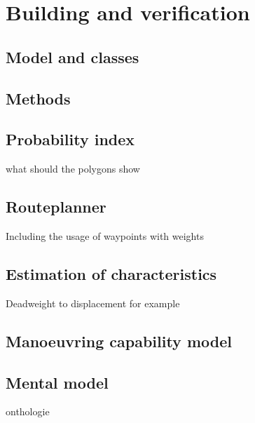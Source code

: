 \chapter{Building and verification}

\section{Model and classes}

\section{Methods}

\section{Probability index}
what should the polygons show

\section{Routeplanner}
Including the usage of waypoints with weights

\section{Estimation of characteristics}
Deadweight to displacement for example

\section{Manoeuvring capability model}

\section{Mental model}
onthologie
